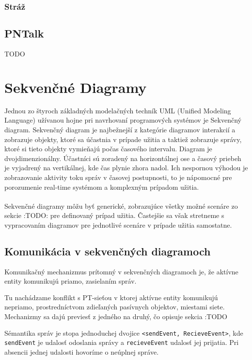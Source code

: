 \subsection{Stráž}

\section{PNTalk}

TODO

\chapter{Sekvenčné Diagramy}

Jednou zo štyroch základných modelačných techník UML (Unified Modeling Language) užívanou hojne pri navrhovaní programových systémov je Sekvenčný diagram. Sekvenčný diagram je najbežnejší z kategórie diagramov interakcií a zobrazuje objekty, ktoré sa účastnia v prípade užitia a taktiež zobrazuje správy, ktoré si tieto objekty vymieňajú počas časového intervalu. Diagram je dvojdimenzionálny. Účastníci sú zoradený na horizontálnej ose a časový priebeh je vyjadrený na vertikálnej, kde čas plynie zhora nadol. Ich nespornou výhodou je zobrazovanie aktivity toku správ v časovej postupnosti, to je nápomocné pre porozumenie real-time systémom a komplexným prípadom užitia. \\\\
Sekvenčné diagramy môžu byť generické, zobrazujúce všetky možné scenáre zo sekcie :TODO: pre definovaný prípad užitia. Častejšie sa však stretneme s vypracovaním diagramov pre jednotlivé scenáre v prípade užitia samostatne.

\section{Komunikácia v sekvenčných diagramoch}

Komunikačný mechanizmus prítomný v sekvenčných diagramoch je, že aktívne entity komunikujú priamo, zasielaním správ. 
\begin{note}
	Tu nachádzame konflikt s PT-sieťou v ktorej aktívne entity komunikujú nepriamo, prostredníctvom zdieľaných pasívnych objektov, miestami siete. Mechanizmy sa dajú previesť z jedného na druhý, čo opisuje sekcia :TODO
\end{note}
Sémantika správ je stopa jednoduchej dvojice \lstinline{<sendEvent, RecieveEvent>}, kde \lstinline{sendEvent} je udalosť odoslania správy a \lstinline{recieveEvent} udalosť jej prijatia. Pri absencii jednej udalosti hovoríme o neúplnej správe.

